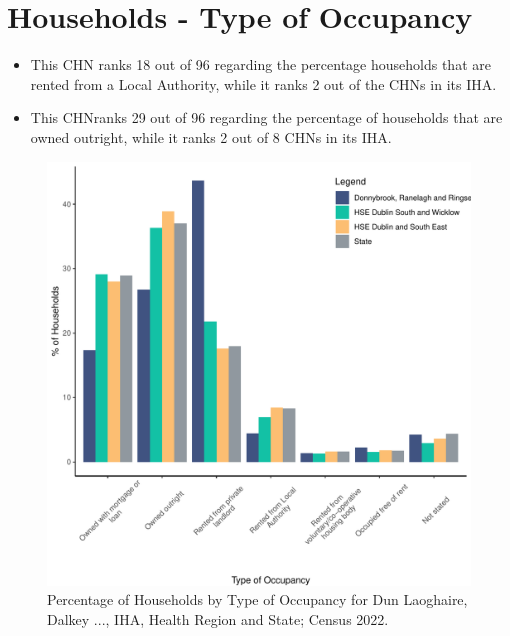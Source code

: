 \documentclass{article}
\begin{document}
\section{Households - Type of Occupancy}\label{sect:Households}
\begin{itemize}
\item This CHN ranks  18 out of 96 regarding the percentage households that are rented from a Local Authority, while it ranks  2 out of the CHNs in its IHA. 
\item This CHNranks  29 out of 96 regarding the percentage of households that are owned outright, while it ranks   2 out of 8 CHNs in its IHA.
\end{itemize}
\begin{figure}[H]
	\centering
	\includegraphics[width = 140mm]{../figures/HouseholdsED.pdf}
	\caption{Percentage of Households by Type of Occupancy for Dun Laoghaire, Dalkey ..., IHA, Health Region and State; Census 2022.}
	\label{fig:vbnv}
	\end{figure}
\end{document}
